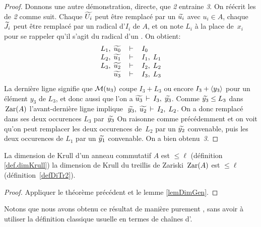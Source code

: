 \begin{proof}
Donnons une autre démonstration, directe, que  \emph{2} entraine \emph{3}.
On réécrit les \entrels de \emph{2} comme suit.
Chaque $\widetilde{U_i}$ peut être remplacé par un $\widetilde{u_i}$ avec $u_i\in 
A$,
chaque~$\widetilde{J_i}$ peut être remplacé par un radical d'\itf $I_i$  de
$A$, et on note $L_i$ à la place de~$x_i$ pour se rappeler qu'il s'agit 
du
radical d'un \itf. On obtient:
$$\begin{array}{rcl}
 L_1,\; \widetilde{u_0}& \,\vdash\,  &  I_0  \\
 L_2,\; \widetilde{u_1}& \,\vdash\,  &  I_1 ,\;  L_1  \\
 L_3,\; \widetilde{u_2}& \,\vdash\,  &  I_2 ,\; L_2  \\
\widetilde{u_3}& \,\vdash\, & I_3 ,\; L_3
\end{array}$$
La dernière ligne signifie que ${\cal M}(u_3)$ coupe $I_3+ L_3$
ou encore  $I_3+ \left\langle{y_3}\right\rangle$ pour un élément $y_3$ de
$L_3$, et donc aussi que l'on a
$ \widetilde{u_3} \,\vdash\,  I_3 ,\; \widetilde{y_3}$.
Comme $\widetilde{y_3}\leq L_3$ dans $\,{\rm Zar}(A)$ l'avant-dernière ligne
implique  $ \;\widetilde{y_3},\; \widetilde{u_2} \,\vdash\,  I_2 ,\; L_2$.
On a donc remplacé dans ses deux occurences  $L_3$ par~$\widetilde{y_3}$
On raisonne comme précédemment et on voit qu'on peut remplacer
les deux occurences de~$L_2$ par un $\widetilde{y_2}$ convenable, puis
les deux occurences de $L_1$ par un $\widetilde{y_1}$ convenable.
On a bien obtenu~\emph{3}.
\end{proof}

\begin{corollary}
\label{corCompDim}
La dimension de Krull d'un anneau commutatif $A$ est $\leq \ell$ (définition \ref{def.dimKrull}) \ssi
la dimension de Krull du treillis de Zariski $\,{\rm Zar}(A)$ est $\leq \ell$
(définition~\ref{defDiTr2}).
\end{corollary}

\begin{proof}
Appliquer le théorème précédent et le lemme \ref{lemDimGen}.
\end{proof}


Notons que nous avons obtenu ce résultat de manière purement \cov, sans avoir à utiliser la définition classique usuelle en termes de chaînes d'\ideps.


